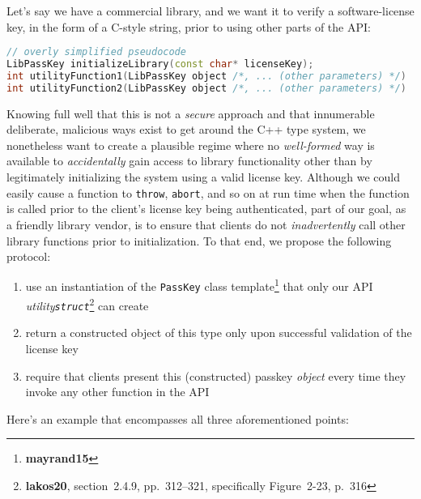 Let's say we have a commercial library, and we want it to verify a
software-license key, in the form of a C-style string, prior to using
other parts of the API:

\begin{lstlisting}[language=C++]
// overly simplified pseudocode
LibPassKey initializeLibrary(const char* licenseKey);
int utilityFunction1(LibPassKey object /*, ... (other parameters) */)
int utilityFunction2(LibPassKey object /*, ... (other parameters) */)
\end{lstlisting}
    
\noindent Knowing full well that this is not a \emph{secure} approach and that
innumerable deliberate, malicious ways exist to get around the C++ type
system, we nonetheless want to create a plausible regime where no
\emph{well-formed} way is available to \emph{accidentally} gain access
to library functionality other than by legitimately initializing the
system using a valid license key. Although we could easily cause a
function to \texttt{throw}, \texttt{abort}, and so on at run time when
the function is called prior to the client's license key being
authenticated, part of our goal, as a friendly library vendor, is to
ensure that clients do not \emph{inadvertently} call other library
functions prior to initialization. To that end, we propose the following protocol:
\begin{enumerate}
\item{use an instantiation of the \texttt{PassKey} class template\cprotect\footnote{\textbf{mayrand15}} that only our API \emph{utility}\linebreak[4] \emph{\texttt{struct}}\cprotect\footnote{\textbf{lakos20}, section~2.4.9, pp.~312--321, specifically Figure~2-23, p.~316} can create}
\item{return a constructed object of this type only upon successful validation of the license key}
\item{require that clients present this (constructed) passkey \emph{object} every time they invoke any other function in the API}
\end{enumerate}
Here's an example that encompasses all three aforementioned points:

